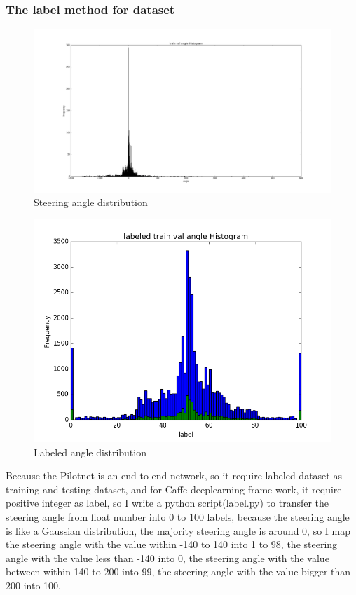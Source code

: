 \documentclass[10pt,twocolumn,letterpaper]{article}
\begin{document}
\subsubsection{The label method for dataset}


\begin{figure}[h]
	\begin{center}
		
		\includegraphics[width=0.8\linewidth]{steering_angle.png}
	\end{center}
	\caption{Steering angle distribution}
	\label{fig:long4}
	\label{fig:onecol4}
\end{figure}

\begin{figure}[h]
	\begin{center}
		
		\includegraphics[width=0.8\linewidth]{label_angle.png}
	\end{center}
	\caption{Labeled angle distribution}
	\label{fig:long5}
	\label{fig:onecol5}
\end{figure}


Because the Pilotnet is an end to end network, so it require labeled dataset as training and testing dataset, and for Caffe deeplearning frame work, it require positive integer as label, so I write a python script(label.py) to transfer the steering angle from float number into 0 to 100 labels, because the steering angle is like a Gaussian distribution, the majority steering angle is around 0, so I map the steering angle with the value within -140 to 140 into 1 to 98, the steering angle with the value less than -140 into 0, the steering angle with the value between within 140 to 200 into 99, the steering angle with the value bigger than 200 into 100.
\end{document}
